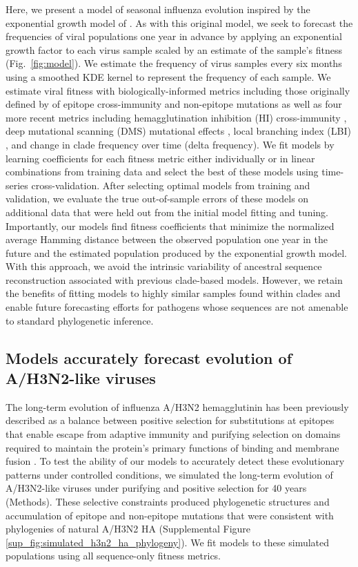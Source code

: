 Here, we present a model of seasonal influenza evolution inspired by the exponential growth model of \cite{Luksza:2014hj}.
As with this original model, we seek to forecast the frequencies of viral populations one year in advance by applying an exponential growth factor to each virus sample scaled by an estimate of the sample's fitness (Fig.~\ref{fig:model}).
We estimate the frequency of virus samples every six months using a smoothed KDE kernel to represent the frequency of each sample.
We estimate viral fitness with biologically-informed metrics including those originally defined by \cite{Luksza:2014hj} of epitope cross-immunity and non-epitope mutations as well as four more recent metrics including hemagglutination inhibition (HI) cross-immunity \cite{Neher:2016hy}, deep mutational scanning (DMS) mutational effects \cite{Lee2018}, local branching index (LBI) \cite{Neher:2014eu}, and change in clade frequency over time (delta frequency).
We fit models by learning coefficients for each fitness metric either individually or in linear combinations from training data and select the best of these models using time-series cross-validation.
After selecting optimal models from training and validation, we evaluate the true out-of-sample errors of these models on additional data that were held out from the initial model fitting and tuning.
Importantly, our models find fitness coefficients that minimize the normalized average Hamming distance between the observed population one year in the future and the estimated population produced by the exponential growth model.
With this approach, we avoid the intrinsic variability of ancestral sequence reconstruction associated with previous clade-based models.
However, we retain the benefits of fitting models to highly similar samples found within clades and enable future forecasting efforts for pathogens whose sequences are not amenable to standard phylogenetic inference.

\subsection*{Models accurately forecast evolution of A/H3N2-like viruses}

The long-term evolution of influenza A/H3N2 hemagglutinin has been previously described as a balance between positive selection for substitutions at epitopes that enable escape from adaptive immunity and purifying selection on domains required to maintain the protein's primary functions of binding and membrane fusion \cite{Bush:1999vj,Neher2013,Luksza:2014hj,Koelle:2015dh}.
To test the ability of our models to accurately detect these evolutionary patterns under controlled conditions, we simulated the long-term evolution of A/H3N2-like viruses under purifying and positive selection for 40 years (Methods).
These selective constraints produced phylogenetic structures and accumulation of epitope and non-epitope mutations that were consistent with phylogenies of natural A/H3N2 HA (Supplemental Figure \ref{sup_fig:simulated_h3n2_ha_phylogeny}).
We fit models to these simulated populations using all sequence-only fitness metrics.

